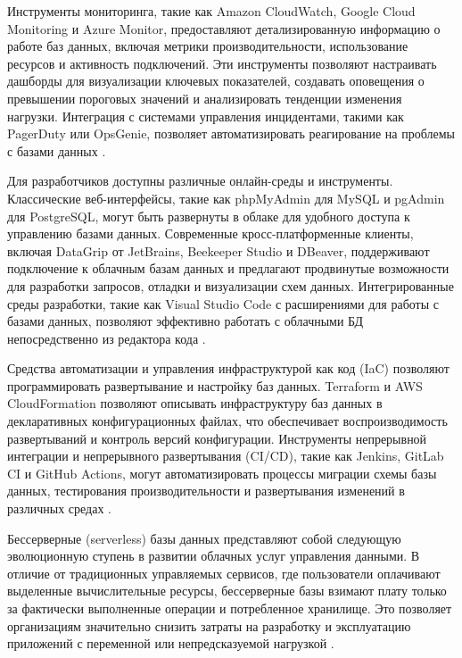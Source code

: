 \documentclass{SibFU-docs}
\begin{document}
Инструменты мониторинга, такие как Amazon CloudWatch, Google Cloud Monitoring и Azure Monitor, предоставляют детализированную информацию о работе баз данных, включая метрики производительности, использование ресурсов и активность подключений. Эти инструменты позволяют настраивать дашборды для визуализации ключевых показателей, создавать оповещения о превышении пороговых значений и анализировать тенденции изменения нагрузки. Интеграция с системами управления инцидентами, такими как PagerDuty или OpsGenie, позволяет автоматизировать реагирование на проблемы с базами данных \cite{prometheus}.

Для разработчиков доступны различные онлайн-среды и инструменты. Классические веб-интерфейсы, такие как phpMyAdmin для MySQL и pgAdmin для PostgreSQL, могут быть развернуты в облаке для удобного доступа к управлению базами данных. Современные кросс-платформенные клиенты, включая DataGrip от JetBrains, Beekeeper Studio и DBeaver, поддерживают подключение к облачным базам данных и предлагают продвинутые возможности для разработки запросов, отладки и визуализации схем данных. Интегрированные среды разработки, такие как Visual Studio Code с расширениями для работы с базами данных, позволяют эффективно работать с облачными БД непосредственно из редактора кода \cite{debezium}.

Средства автоматизации и управления инфраструктурой как код (IaC) позволяют программировать развертывание и настройку баз данных. Terraform и AWS CloudFormation позволяют описывать инфраструктуру баз данных в декларативных конфигурационных файлах, что обеспечивает воспроизводимость развертываний и контроль версий конфигурации. Инструменты непрерывной интеграции и непрерывного развертывания (CI/CD), такие как Jenkins, GitLab CI и GitHub Actions, могут автоматизировать процессы миграции схемы базы данных, тестирования производительности и развертывания изменений в различных средах \cite{debezium}.


Бессерверные (serverless) базы данных представляют собой следующую эволюционную ступень в развитии облачных услуг управления данными. В отличие от традиционных управляемых сервисов, где пользователи оплачивают выделенные вычислительные ресурсы, бессерверные базы взимают плату только за фактически выполненные операции и потребленное хранилище. Это позволяет организациям значительно снизить затраты на разработку и эксплуатацию приложений с переменной или непредсказуемой нагрузкой \cite{cockroach}.
\end{document}

